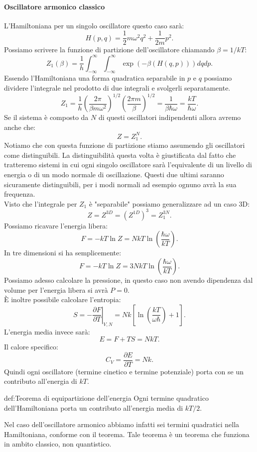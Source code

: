\paragraph{Oscillatore armonico classico}
L'Hamiltoniana per un singolo oscillatore questo caso sarà:
\[
	H( p,q) = \frac{1}{2}m\omega ^2q^2 + \frac{1}{2m}p^2
.\] 
Possiamo scrivere la funzione di partizione dell'oscillatore chiamando $\beta  = 1 /kT$:
\[
	Z_1( \beta )  = \frac{1}{h}\int_{-\infty}^{\infty} \int_{-\infty}^{\infty} \exp\left( -\beta \left( H( q,p)  \right)  \right) dqdp  
.\] 
Essendo l'Hamiltoniana una forma quadratica separabile in $p$ e $q$ possiamo dividere l'integrale nel prodotto di due integrali e svolgerli separatamente.
\[
	Z_1 = \frac{1}{h}\left( \frac{2\pi}{\beta m\omega ^2} \right) ^{1 /2}\left( \frac{2\pi m }{\beta } \right) ^{1/ 2} = \frac{1}{\beta \hbar \omega }= \frac{kT}{\hbar\omega }
.\] 
Se il sistema è composto da $N$ di questi oscillatori indipendenti allora avremo anche che:
\[
	Z = Z_{1}^{N}
.\] 
Notiamo che con questa funzione di partizione stiamo assumendo gli oscillatori come distinguibili. La distinguibilità questa volta è giustificata dal fatto che tratteremo sistemi in cui ogni singolo oscillatore sarà l'equivalente di un livello di energia o di un modo normale di oscillazione. Questi due ultimi saranno sicuramente distinguibili, per i modi normali ad esempio ognuno avrà la sua frequenza.\\
Visto che l'integrale per $Z_1$ è "separabile" possiamo generalizzare ad un caso 3D:
\[
	Z = Z^{3D}= \left( Z^{1D} \right)^3 = Z_1^{3N}
.\] 
Possiamo ricavare l'energia libera:
\[
	F = -kT \ln Z = NkT \ln \left( \frac{\hbar\omega }{kT} \right) 
.\] 
In tre dimensioni si ha semplicemente:
\[
	F = -kT \ln Z = 3NkT \ln \left( \frac{\hbar\omega }{kT} \right) 
.\] 
Possiamo adesso calcolare la pressione, in questo caso non avendo dipendenza dal volume per l'energia libera si avrà $P = 0$. \\
È inoltre possibile calcolare l'entropia:
 \[
	 S = -\left.\frac{\partial F}{\partial T} \right|_{V, N} = Nk \left[ \ln \left( \frac{kT}{\omega \hbar} \right) +1  \right] 
.\] 
L'energia media invece sarà:
\[
	E = F + TS = NkT
.\] 
Il calore specifico:
\[
	C_{V} = \frac{\partial E}{\partial T} = Nk
.\] 
Quindi ogni oscillatore (termine cinetico e termine potenziale) porta con se un contributo all'energia di $kT$.
\begin{defn}{def:Teorema di equipartizione dell'energia}
	Ogni termine quadratico dell'Hamiltoniana porta un contributo all'energia media di $kT /2$.
\end{defn}
Nel caso dell'oscillatore armonico abbiamo infatti sei termini quadratici nella Hamiltoniana, conforme con il teorema. Tale teorema è un teorema che funziona in ambito classico, non quantistico.
